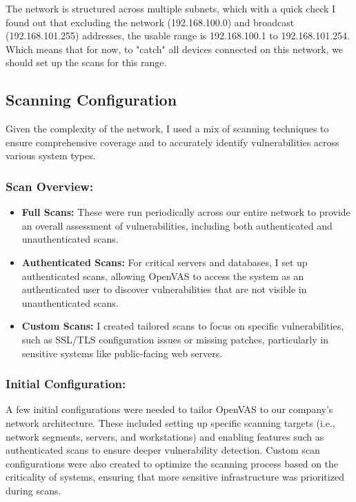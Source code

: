 \documentclass[twocolumn]{article}
\begin{document}
The network is structured across multiple subnets, which with a quick check I found out that excluding the network (192.168.100.0) and broadcast (192.168.101.255) addresses, the usable range is
192.168.100.1 to 192.168.101.254. Which means that for now, to "catch" all devices connected on this network, we should set up the scans for this range.

\subsection{Scanning Configuration}

Given the complexity of the network, I used a mix of scanning techniques to ensure comprehensive coverage and to accurately identify vulnerabilities across various system types.

\subsubsection{Scan Overview:}

\begin{itemize}
    \item \textbf{Full Scans:} These were run periodically across our entire network to provide an overall assessment of vulnerabilities, including both authenticated and unauthenticated scans.
    \item \textbf{Authenticated Scans:} For critical servers and databases, I set up authenticated scans, allowing OpenVAS to access the system as an authenticated user to discover vulnerabilities that are not visible in unauthenticated scans.
    \item \textbf{Custom Scans:} I created tailored scans to focus on specific vulnerabilities, such as SSL/TLS configuration issues or missing patches, particularly in sensitive systems like public-facing web servers.
\end{itemize}

\subsubsection{Initial Configuration:}

A few initial configurations were needed to tailor OpenVAS to our company’s network architecture. These included setting up specific scanning targets (i.e., network segments, servers, and workstations) and enabling features such as authenticated scans to ensure deeper vulnerability detection. Custom scan configurations were also created to optimize the scanning process based on the criticality of systems, ensuring that more sensitive infrastructure was prioritized during scans.
\end{document}
